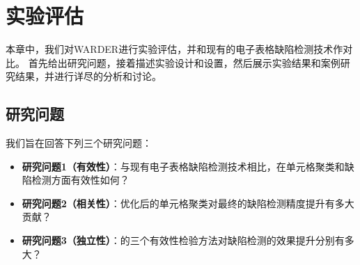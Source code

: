 \chapter{实验评估}

本章中，我们对WARDER进行实验评估，并和现有的电子表格缺陷检测技术作对比。
首先给出研究问题，接着描述实验设计和设置，然后展示实验结果和案例研究结果，并进行详尽的分析和讨论。


\section{研究问题}
我们旨在回答下列三个研究问题：
\begin{itemize}
    \item \textbf{研究问题1（有效性）}：与现有电子表格缺陷检测技术相比，\wa 在单元格聚类和缺陷检测方面有效性如何？
    \item \textbf{研究问题2（相关性）}：\wa 优化后的单元格聚类对最终的缺陷检测精度提升有多大贡献？
    \item \textbf{研究问题3（独立性）}：\wa 的三个有效性检验方法对缺陷检测的效果提升分别有多大？
\end{itemize}




